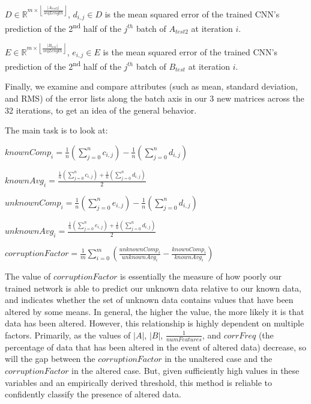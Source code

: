 \documentclass{acm_proc_article-sp}
\begin{document}
  $D \in \mathbb{R}^{m \times \left \lfloor \frac{|A_{test2}|}{seqLength} \right \rfloor}$, $d_{i,j} \in D$ is the mean squared error of the trained CNN's prediction of the 2\textsuperscript{nd} half of the $j^{th}$ batch of $A_{test2}$ at iteration $i$.

  $E \in \mathbb{R}^{m \times \left \lfloor \frac{|B_{test}|}{seqLength} \right \rfloor}$, $e_{i,j} \in E$ is the mean squared error of the trained CNN's prediction of the 2\textsuperscript{nd} half of the $j^{th}$ batch of $B_{test}$ at iteration $i$.

  Finally, we examine and compare attributes (such as mean, standard deviation, and RMS) of the error lists along the batch axis in our 3 new matrices across the 32 iterations, to get an idea of the general behavior.

  The main task is to look at:

  $knownComp_{i} = \frac{1}{n}\left(\sum\limits_{j=0}^n{c_{i,j}}\right) - \frac{1}{n}\left(\sum\limits_{j=0}^n{d_{i,j}}\right)$

  $knownAvg_{i} = \frac{\frac{1}{n}\left(\sum\limits_{j=0}^n{c_{i,j}}\right) + \frac{1}{n}\left(\sum\limits_{j=0}^n{d_{i,j}}\right)}{2}$

  $unknownComp_{i} = \frac{1}{n}\left(\sum\limits_{j=0}^n{e_{i,j}}\right) - \frac{1}{n}\left(\sum\limits_{j=0}^n{d_{i,j}}\right)$

  $unknownAvg_{i} = \frac{\frac{1}{n}\left(\sum\limits_{j=0}^n{e_{i,j}}\right) + \frac{1}{n}\left(\sum\limits_{j=0}^n{d_{i,j}}\right)}{2}$

  $corruptionFactor = \frac{1}{m}\sum\limits_{i=0}^m{\left(\frac{unknownComp_{i}}{unknownAvg_{i}} - \frac{knownComp_{i}}{knownAvg_{i}}\right)}$
  
  The value of $corruptionFactor$ is essentially the measure of how poorly our trained network is able to predict our unknown data relative to our known data, and indicates whether the set of unknown data contains values that have been altered by some means. In general, the higher the value, the more likely it is that data has been altered. However, this relationship is highly dependent on multiple factors. Primarily, as the values of $|A|$, $|B|$, $\frac{1}{numFeatures}$, and $corrFreq$ (the percentage of data that has been altered in the event of altered data) decrease, so will the gap between the $corruptionFactor$ in the unaltered case and the $corruptionFactor$ in the altered case. But, given sufficiently high values in these variables and an empirically derived threshold, this method is reliable to confidently classify the presence of altered data.
\end{document}
